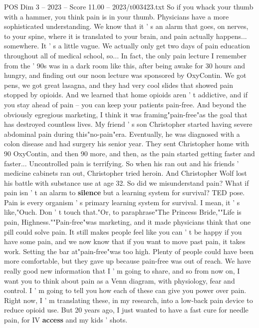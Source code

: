 \begin{textsample}{POS Dim 3 – 2023 – Score 11.00 – 2023/t003423.txt}  \label{ex:f3_pos_040}
So if you whack your thumb with a hammer, you think pain is in your thumb.
Physicians have a more sophisticated understanding.
We know that it ' s an alarm that goes, on nerves, to your spine, where it is translated to your brain, and pain actually happens... somewhere.
It ' s a little vague.
We actually only get two days of pain education throughout all of medical school, so...
In fact, the only pain lecture I remember from the ' 90s was in a dark room like this, after being awake for 30 hours and hungry, and finding out our noon lecture was sponsored by OxyContin.
We got pens, we got great lasagna, and they had very cool slides that showed pain stopped by opioids.
And we learned that home opioids aren ' t addictive, and if you stay ahead of pain -- you can keep your patients pain-free.
And beyond the obviously egregious marketing, I think it was framing"pain-free"as the goal that has destroyed countless lives.
My friend ' s son Christopher started having severe abdominal pain during this"no-pain"era.
Eventually, he was diagnosed with a colon disease and had surgery his senior year.
They sent Christopher home with 90 OxyContin, and then 90 more, and then, as the pain started getting faster and faster...
Uncontrolled pain is terrifying.
So when his ran out and his friends ' medicine cabinets ran out, Christopher tried heroin.
And Christopher Wolf lost his battle with substance use at age 32.
So did we misunderstand pain?
What if pain isn ' t an alarm to \textbf{silence} but a learning system for survival?
TED pose.
Pain is every organism ' s primary learning system for survival.
I mean, it ' s like,"Ouch.
Don ' t touch that."Or, to paraphrase"The Princess Bride,""Life is pain, Highness.""Pain-free"was marketing, and it made physicians think that one pill could solve pain.
It still makes people feel like you can ' t be happy if you have some pain, and we now know that if you want to move past pain, it takes work.
Setting the bar at"pain-free"was too high.
Plenty of people could have been more comfortable, but they gave up because pain-free was out of reach.
We have really good new information that I ' m going to share, and so from now on, I want you to think about pain as a Venn diagram, with physiology, fear and control.
I ' m going to tell you how each of these can give you power over pain.
Right now, I ' m translating these, in my research, into a low-back pain device to reduce opioid use.
But 20 years ago, I just wanted to have a fast cure for needle pain, for IV \textbf{access} and my kids ' shots.

\end{textsample}
